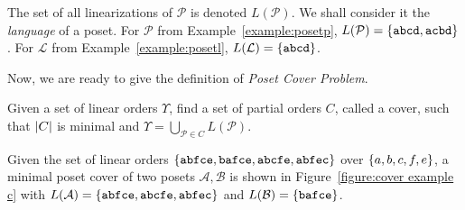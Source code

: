 \documentclass[12pt]{llncs}
\DeclarePairedDelimiter{\set}{\{}{\}}
\DeclarePairedDelimiter{\abs}{\lvert}{\rvert}
\newcommand{\poset}[1]{\mathcal{#1}}
\newcommand{\lang}[1]{L(#1)}
\newcommand{\lin}[1]{\texttt{#1}}
\begin{document}
The set of all linearizations of $\poset{P}$ is denoted $\lang{\poset{P}}$. We shall consider it the \emph{language} of a poset. For $\poset{P}$ from Example~\ref{example:posetp}, $\lang{\poset{P}} = \set{\lin{abcd},\lin{acbd}}$. For $\poset{L}$ from Example~\ref{example:posetl}, $\lang{\poset{L}} = \set{\lin{abcd}}$.

Now, we are ready to give the definition of \emph{Poset Cover Problem}.

\begin{definition}
    Given a set of linear orders $\Upsilon$, find a set of partial orders $C$, called a cover, such that $\abs{C}$ is minimal and $\Upsilon = \bigcup_{\poset{P} \in C} \lang{\poset{P}}$.
    \label{definition:pcp}
\end{definition}

\begin{example}
    Given the set of linear orders $\set{\lin{abfce},\lin{bafce},\lin{abcfe},\lin{abfec}}$ over $\set{a,b,c,f,e}$, a minimal poset cover of two posets $\poset{A},\poset{B}$ is shown in Figure~\ref{figure:cover example c} with ${\lang{\poset{A}} = \set{\lin{abfce},\lin{abcfe},\lin{abfec}}}$ and ${\lang{\poset{B}} = \set{\lin{bafce}}}$.
    \label{example:cover example}
\end{example}
\end{document}
